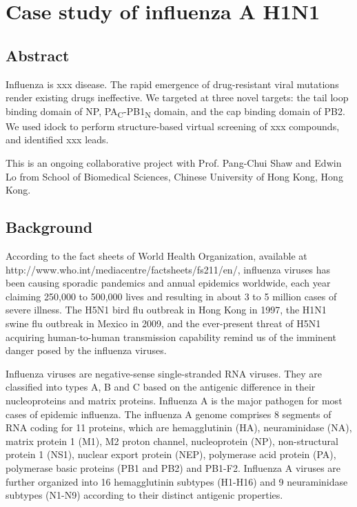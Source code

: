 \chapter{Case study of influenza A H1N1}
\label{influenza}

\section{Abstract}

Influenza is xxx disease. The rapid emergence of drug-resistant viral mutations render existing drugs ineffective. We targeted at three novel targets: the tail loop binding domain of NP, PA\textsubscript{C}-PB1\textsubscript{N} domain, and the cap binding domain of PB2. We used idock to perform structure-based virtual screening of xxx compounds, and identified xxx leads.

This is an ongoing collaborative project with Prof. Pang-Chui Shaw and Edwin Lo from School of Biomedical Sciences, Chinese University of Hong Kong, Hong Kong.

\section{Background}

According to the fact sheets of World Health Organization, available at http://www.who.int/mediacentre/factsheets/fs211/en/, influenza viruses has been causing sporadic pandemics and annual epidemics worldwide, each year claiming 250,000 to 500,000 lives and resulting in about 3 to 5 million cases of severe illness. The H5N1 bird flu outbreak in Hong Kong in 1997, the H1N1 swine flu outbreak in Mexico in 2009, and the ever-present threat of H5N1 acquiring human-to-human transmission capability remind us of the imminent danger posed by the influenza viruses.

Influenza viruses are negative-sense single-stranded RNA viruses. They are classified into types A, B and C based on the antigenic difference in their nucleoproteins and matrix proteins. Influenza A is the major pathogen for most cases of epidemic influenza. The influenza A genome comprises 8 segments of RNA coding for 11 proteins, which are hemagglutinin (HA), neuraminidase (NA), matrix protein 1 (M1), M2 proton channel, nucleoprotein (NP), non-structural protein 1 (NS1), nuclear export protein (NEP), polymerase acid protein (PA), polymerase basic proteins (PB1 and PB2) and PB1-F2. Influenza A viruses are further organized into 16 hemagglutinin subtypes (H1-H16) and 9 neuraminidase subtypes (N1-N9) according to their distinct antigenic properties.

